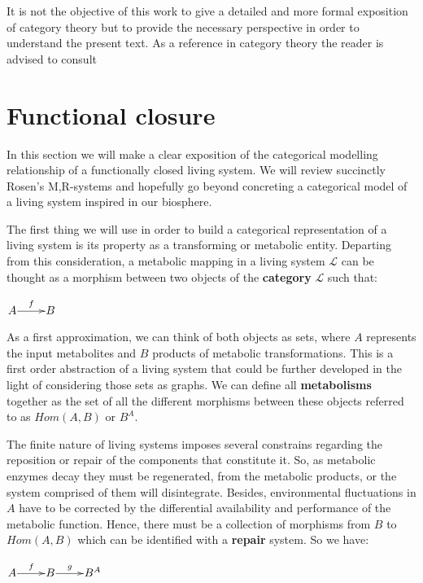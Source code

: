 \documentclass[aps,twocolumn]{revtex4-1}
\begin{document}
It is not the objective of this work to give a detailed and more formal exposition of category theory but to provide the necessary perspective in order to understand the present text. As a reference in category theory the reader is advised to consult

\section{Functional closure}

In this section we will make a clear exposition of the categorical modelling relationship of a functionally closed living system. We will review succinctly Rosen's M,R-systems and hopefully go beyond concreting a categorical model of a living system inspired in our biosphere.

The first thing we will use in order to build a categorical representation of a living system is its property as a transforming or metabolic entity. Departing from this consideration, a metabolic mapping in a living system $\mathcal{L}$ can be thought as a morphism between two objects of the \textbf{category} $\mathcal{L}$ such that:

\begin{center}
	$\xymatrix@1{
	A\ar[r]^-{f} & B
	}$

\end{center}

As a first approximation, we can think of both objects as sets, where $A$ represents the input metabolites and $B$  products of metabolic transformations. This is a first order abstraction of a living system that could be further developed in the light of considering those sets as graphs. We can define all \textbf{metabolisms} together as the set of all the different morphisms between these objects referred to as $Hom(A,B)$ or $B^A$.

The finite nature of living systems imposes several constrains regarding the reposition or repair of the components that constitute it. So, as metabolic enzymes decay they must be regenerated, from the metabolic products, or the system comprised of them will disintegrate. Besides, environmental fluctuations in $A$ have to be corrected by the differential availability and performance of the metabolic function. Hence, there must be a collection of morphisms from $B$ to $Hom(A,B)$ which can be identified with a \textbf{repair} system. So we have:


\begin{center}
	$
	\xymatrix@1{
	A\ar[r]^f &B\ar[r]^-g & B^A}
	$
\end{center}
\end{document}

